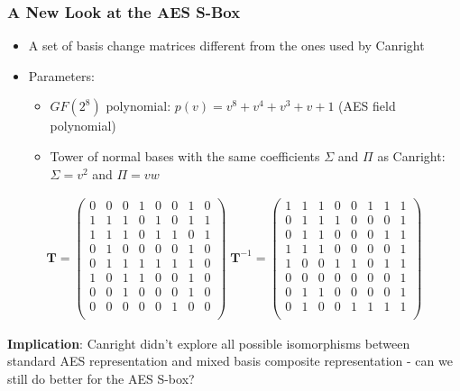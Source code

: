 \documentclass[10pt]{beamer}
\begin{document}
\begin{frame}
	\frametitle{A New Look at the AES S-Box}
	\begin{itemize}
		\item A set of basis change matrices different from the ones used by Canright
		\item Parameters:
		\begin{itemize}
			\item $GF(2^8)$ polynomial: $p(v) = v^8 + v^4 + v^3 + v + 1$ (AES field polynomial)
			\item Tower of normal bases with the same coefficients $\Sigma$ and $\Pi$ as Canright: $\Sigma = v^2$ and $\Pi = vw$
		\end{itemize}
	\end{itemize}
\begin{align*}
\mathbf{T} = 
\begin{pmatrix}
0 & 0 & 0 & 1 & 0 & 0 & 1 & 0 \\
1 & 1 & 1 & 0 & 1 & 0 & 1 & 1 \\
1 & 1 & 1 & 0 & 1 & 1 & 0 & 1 \\
0 & 1 & 0 & 0 & 0 & 0 & 1 & 0 \\
0 & 1 & 1 & 1 & 1 & 1 & 1 & 0 \\
1 & 0 & 1 & 1 & 0 & 0 & 1 & 0 \\
0 & 0 & 1 & 0 & 0 & 0 & 1 & 0 \\
0 & 0 & 0 & 0 & 0 & 1 & 0 & 0 \\
\end{pmatrix}
\;
\mathbf{T}^{-1} = 
\begin{pmatrix}
1 & 1 & 1 & 0 & 0 & 1 & 1 & 1 \\
0 & 1 & 1 & 1 & 0 & 0 & 0 & 1 \\
0 & 1 & 1 & 0 & 0 & 0 & 1 & 1 \\
1 & 1 & 1 & 0 & 0 & 0 & 0 & 1 \\
1 & 0 & 0 & 1 & 1 & 0 & 1 & 1 \\
0 & 0 & 0 & 0 & 0 & 0 & 0 & 1 \\
0 & 1 & 1 & 0 & 0 & 0 & 0 & 1 \\
0 & 1 & 0 & 0 & 1 & 1 & 1 & 1 \\
\end{pmatrix}
\end{align*}

	\begin{center}
		\textbf{Implication}: Canright didn't explore all possible isomorphisms between standard AES representation and mixed basis composite representation - can we still do better for the AES S-box?
	\end{center}

\end{frame}
\end{document}
